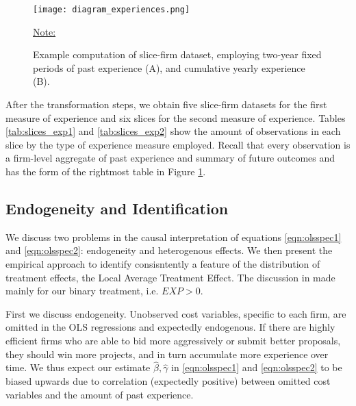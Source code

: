 \begin{figure}
  \texttt{[image: diagram\_experiences.png]}
  \caption{Example computation of slice-firm dataset, employing two-year fixed periods of past experience (A), and cumulative yearly experience (B).}
  \label{fig:diagram_experience}
  \vskip 0.5mm
  { \footnotesize \underline{Note:} }
\end{figure}


After the transformation steps, we obtain five slice-firm datasets for the first measure of experience and six slices for the second measure of experience. Tables \ref{tab:slices_exp1} and \ref{tab:slices_exp2} show the amount of observations in each slice by the type of experience measure employed. Recall that every observation is a firm-level aggregate of past experience and summary of future outcomes and has the form of the rightmost table in Figure \ref{fig:diagram_experience}.








\subsection{Endogeneity and Identification}
We discuss two problems in the causal interpretation of equations \ref{eqn:olsspec1} and \ref{eqn:olsspec2}: endogeneity and heterogenous effects. We then present the empirical approach to identify consisntently a feature of the distribution of treatment effects, the Local Average Treatment Effect. The discussion in made mainly for our binary treatment, i.e. $EXP>0$.

First we discuss endogeneity. Unobserved cost variables, specific to each firm, are omitted in the OLS regressions and expectedly endogenous. If there are highly efficient firms who are able to bid more aggressively or submit better proposals, they should win more projects, and in turn accumulate more experience over time. We thus expect our estimate $\hat{\beta},\hat{\gamma}$ in \ref{eqn:olsspec1} and \ref{eqn:olsspec2} to be biased upwards due to correlation (expectedly positive) between omitted cost variables and the amount of past experience.

